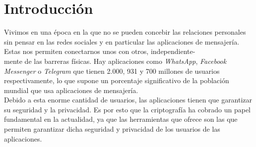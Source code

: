 \chapter{Introducción}
Vivimos en una época en la que no se pueden concebir las relaciones personales sin pensar en las redes sociales y en particular las aplicaciones de mensajería. Estas nos permiten conectarnos unos con otros, independiente-\\mente de las barreras físicas.
Hay aplicaciones como  \emph{WhatsApp}, \emph{Facebook Messenger} o \emph{Telegram} que tienen 2.000, 931 y 700 millones de usuarios respectivamente, lo que supone un porcentaje significativo de la población mundial que usa aplicaciones de mensajería.\\  
Debido a esta enorme cantidad de usuarios, las aplicaciones tienen que garantizar su seguridad y la privacidad. Es por esto que la criptografía ha cobrado un papel fundamental en la actualidad, ya que las herramientas que ofrece son las que permiten garantizar dicha seguridad y privacidad de los usuarios de las aplicaciones.

